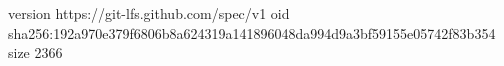 version https://git-lfs.github.com/spec/v1
oid sha256:192a970e379f6806b8a624319a141896048da994d9a3bf59155e05742f83b354
size 2366
